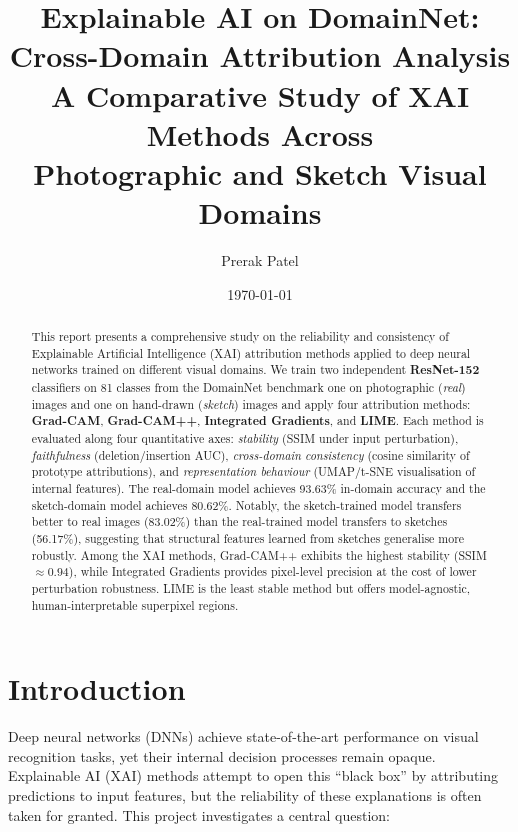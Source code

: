 \documentclass[12pt, a4paper]{article}
\title{%
    \textbf{Explainable AI on DomainNet:\\
    Cross-Domain Attribution Analysis}\\[0.8em]
    \large A Comparative Study of XAI Methods Across \\
    Photographic and Sketch Visual Domains
}
\author{Prerak Patel}
\date{\today}
\begin{document}
\maketitle

\begin{abstract}
This report presents a comprehensive study on the reliability and consistency
of Explainable Artificial Intelligence (XAI) attribution methods applied to
deep neural networks trained on different visual domains.  We train two
independent \textbf{ResNet-152} classifiers on 81 classes from the DomainNet
benchmark one on photographic (\textit{real}) images and one on hand-drawn
(\textit{sketch}) images  and apply four attribution methods: \textbf{Grad-CAM},
\textbf{Grad-CAM++}, \textbf{Integrated Gradients}, and \textbf{LIME}.
Each method is evaluated along four quantitative axes:
\emph{stability} (SSIM under input perturbation),
\emph{faithfulness} (deletion/insertion AUC),
\emph{cross-domain consistency} (cosine similarity of prototype attributions),
and \emph{representation behaviour} (UMAP/t-SNE visualisation of internal
features).  The real-domain model achieves 93.63\% in-domain accuracy and the
sketch-domain model achieves 80.62\%.  Notably, the sketch-trained model
transfers better to real images (83.02\%) than the real-trained model transfers
to sketches (56.17\%), suggesting that structural features learned from sketches
generalise more robustly.  Among the XAI methods, Grad-CAM++ exhibits the
highest stability (SSIM $\approx 0.94$), while Integrated Gradients provides
pixel-level precision at the cost of lower perturbation robustness.  LIME is
the least stable method but offers model-agnostic, human-interpretable
superpixel regions.
\end{abstract}

\tableofcontents
\newpage

\section{Introduction}
\label{sec:introduction}

Deep neural networks (DNNs) achieve state-of-the-art performance on visual
recognition tasks, yet their internal decision processes remain opaque.
Explainable AI (XAI) methods attempt to open this ``black box'' by attributing
predictions to input features, but the reliability of these explanations is
often taken for granted.  This project investigates a central question:
\end{document}
